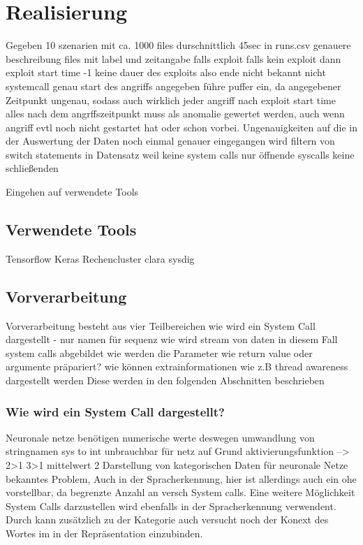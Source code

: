 
\chapter{Realisierung}\label{ch:realisierung}
    Gegeben 10 szenarien mit ca. 1000 files durschnittlich 45sec
    in runs.csv genauere beschreibung files mit label und zeitangabe falls exploit
    falls kein exploit dann exploit start time -1
    keine dauer des exploits also ende nicht bekannt 
    nicht systemcall genau start des angriffs angegeben 
    führe puffer ein, da angegebener Zeitpunkt ungenau, sodass auch wirklich jeder angriff nach exploit start time
    alles nach dem angrffszeitpunkt muss als anomalie gewertet werden, auch wenn angriff evtl noch nicht gestartet hat oder schon vorbei.
    Ungenauigkeiten auf die in der Auswertung der Daten noch einmal genauer eingegangen wird
    filtern von switch statements in Datensatz weil keine system calls
    nur öffnende syscalls keine schließenden

    Eingehen auf verwendete Tools 

\section{Verwendete Tools}
    Tensorflow Keras
    Rechencluster clara
    sysdig

\section{Vorverarbeitung}

    Vorverarbeitung besteht aus vier Teilbereichen 
    wie wird ein System Call dargestellt - nur namen für sequenz
    wie wird stream von daten in diesem Fall system calls abgebildet
    wie werden die Parameter wie return value oder argumente präpariert?
    wie können extrainformationen wie z.B thread awareness dargestellt werden
    Diese werden in den folgenden Abschnitten beschrieben

    \subsection{Wie wird ein System Call dargestellt?}

        Neuronale netze benötigen numerische werte deswegen umwandlung von stringnamen 
        sys to int unbrauchbar für netz auf Grund aktivierungsfunktion --> 2>1 3>1 mittelwert 2
        Darstellung von kategorischen Daten für neuronale Netze bekanntes Problem,
        Auch in der Spracherkennung, hier ist allerdings auch ein ohe vorstellbar, da begrenzte Anzahl an versch
        System calls.
        Eine weitere Möglichkeit System Calls darzustellen wird ebenfalls in der Spracherkennung verwendent.
        Durch  kann zusätzlich zu der Kategorie auch versucht noch der Konext des Wortes im in der Repräsentation einzubinden.

